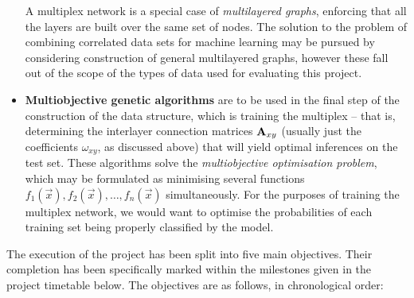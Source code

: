 \begin{itemize}
    A multiplex network is a special case of \emph{multilayered graphs}, enforcing that all the layers are built over the same set of nodes. The solution to the problem of combining correlated data sets for machine learning may be pursued by considering construction of general multilayered graphs, however these fall out of the scope of the types of data used for evaluating this project.
    \item \textbf{Multiobjective genetic algorithms} are to be used in the final step of the construction of the data structure, which is training the multiplex -- that is, determining the interlayer connection matrices ${\bf A}_{xy}$ (usually just the coefficients $\omega_{xy}$, as discussed above) that will yield optimal inferences on the test set. These algorithms solve the \emph{multiobjective optimisation problem}, which may be formulated as minimising several functions $f_1(\vec{x}), f_2(\vec{x}), \dots, f_n(\vec{x})$ simultaneously. For the purposes of training the multiplex network, we would want to optimise the probabilities of each training set being properly classified by the model.
\end{itemize}
The execution of the project has been split into five main objectives. Their completion has been specifically marked within the milestones given in the project timetable below. The objectives are as follows, in chronological order:
